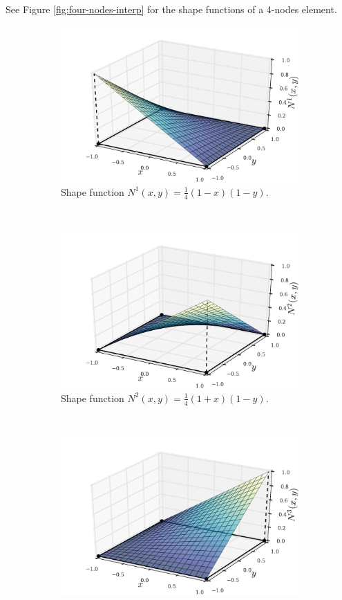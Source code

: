 See Figure \ref{fig:four-nodes-interp} for the shape functions of a 4-nodes element.
\begin{figure}[H]
\centering
	\begin{subfigure}[b]{0.45\textwidth}\qquad
		\includegraphics[width=\textwidth]{shape_func-4-nodes-1.pdf}
		\caption{Shape function ${N^1(x,y)=\frac{1}{4}(1-x)(1-y)}$. }
	\end{subfigure}\,
%
	\begin{subfigure}[b]{0.45\textwidth}\qquad
		\includegraphics[width=\textwidth]{shape_func-4-nodes-2.pdf}
		\caption{Shape function ${N^2(x,y)=\frac{1}{4}(1+x)(1-y)}$.}
	\end{subfigure}\\
%
	\begin{subfigure}[b]{0.45\textwidth}\qquad
		\includegraphics[width=\textwidth]{shape_func-4-nodes-3.pdf}

\end{subfigure}
\end{figure}
